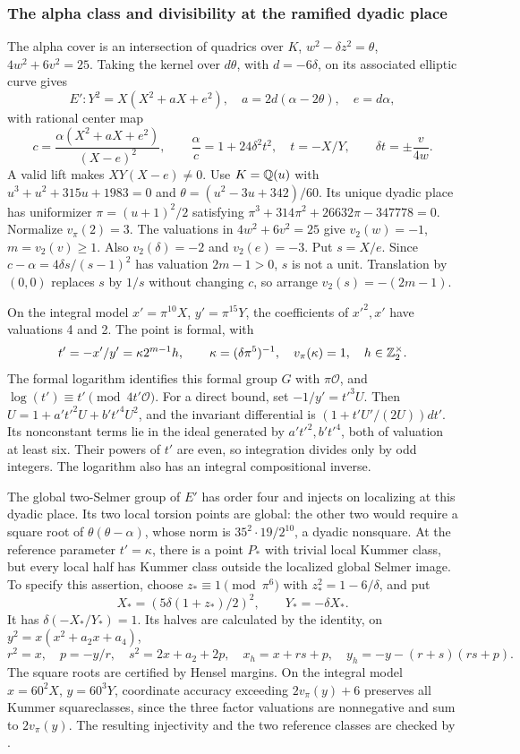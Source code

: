 \subsubsection{The alpha class and divisibility at the ramified dyadic place}

The alpha cover is an intersection of quadrics over $K$,
$w^2-\delta z^2=\theta$, $4w^2+6v^2=25$. Taking the kernel over
$d\theta$, with $d=-6\delta$, on its associated elliptic curve gives
\[
 E':Y^2=X(X^2+aX+e^2),\quad
 a=2d(\alpha-2\theta),\quad e=d\alpha,
\]
with rational center map
\[
 c=\frac{\alpha(X^2+aX+e^2)}{(X-e)^2},\qquad
 \frac{\alpha}{c}=1+24\delta^2t^2,\quad t=-X/Y,
 \qquad \delta t=\pm\frac{v}{4w}.
\]
A valid lift makes $XY(X-e)\ne0$.
Use $K=\mathbb Q(u)$ with $u^3+u^2+315u+1983=0$ and
$\theta=(u^2-3u+342)/60$. Its unique dyadic place has uniformizer
$\pi=(u+1)^2/2$ satisfying
$\pi^3+314\pi^2+26632\pi-347778=0$. Normalize $v_\pi(2)=3$.
The valuations in $4w^2+6v^2=25$ give
$v_2(w)=-1$, $m=v_2(v)\geq1$. Also
$v_2(\delta)=-2$ and $v_2(e)=-3$. Put $s=X/e$.
Since $c-\alpha=4\delta s/(s-1)^2$ has valuation $2m-1>0$,
$s$ is not a unit. Translation by $(0,0)$ replaces $s$ by $1/s$
without changing $c$, so arrange $v_2(s)=-(2m-1)$.

On the integral model $x'=\pi^{10}X$, $y'=\pi^{15}Y$, the
coefficients of $x'^2,x'$ have valuations 4 and 2. The point is
formal, with
\[
 t'=-x'/y'=\kappa2^{m-1}h,\qquad
 \kappa=(\delta\pi^5)^{-1},\quad v_\pi(\kappa)=1,
 \quad h\in\mathbb Z_2^\times.
\]
The formal logarithm identifies this formal group $G$ with
$\pi\mathcal O$, and $\log(t')\equiv t'\pmod{4t'\mathcal O}$.
For a direct bound, set $-1/y'=t'^3U$. Then
$U=1+a't'^2U+b't'^4U^2$, and the invariant differential is
$(1+t'U'/(2U))dt'$. Its nonconstant terms lie in the ideal generated
by $a't'^2,b't'^4$, both of valuation at least six. Their powers of
$t'$ are even, so integration divides only by odd integers. The
logarithm also has an integral compositional inverse.

The global two-Selmer group of $E'$ has order four and injects on
localizing at this dyadic place. Its two local torsion points are
global: the other two would require a square root of
$\theta(\theta-\alpha)$, whose norm is
$35^2\cdot19/2^{10}$, a dyadic nonsquare. At the reference parameter
$t'=\kappa$, there is a point $P_*$ with trivial local Kummer
class, but every local half has Kummer class outside the localized
global Selmer image. To specify this assertion, choose
$z_*\equiv1\pmod{\pi^6}$ with $z_*^2=1-6/\delta$, and put
\[
 X_*=(5\delta(1+z_*)/2)^2,\qquad Y_*=-\delta X_*.
\]
It has $\delta(-X_*/Y_*)=1$. Its halves are calculated by the
identity, on $y^2=x(x^2+a_2x+a_4)$,
\[
 r^2=x,\quad p=-y/r,\quad s^2=2x+a_2+2p,\quad
 x_h=x+rs+p,\quad y_h=-y-(r+s)(rs+p).
\]
The square roots are certified by Hensel margins. On the integral
model $x=60^2X$, $y=60^3Y$, coordinate accuracy exceeding
$2v_\pi(y)+6$ preserves all Kummer squareclasses, since the three
factor valuations are nonnegative and sum to $2v_\pi(y)$.
The resulting injectivity and the two reference classes are checked
by .

